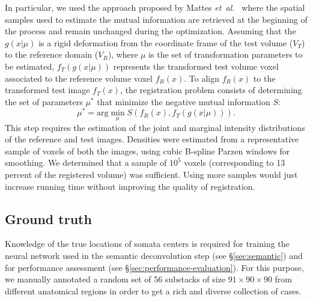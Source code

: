 \documentclass[smallextended]{svjour3}       %
\newcommand{\etal}{\mbox{\emph{et al.\ }}}
\begin{document}
In particular, we used the approach proposed by Mattes \etal
\cite{mattes_nonrigid_2001} where the spatial samples used to
estimate the mutual information are retrieved at the beginning of the
process and remain unchanged during the optimization.
Assuming that the $g(x|\mu)$
is a rigid deformation from the coordinate frame of the test volume
($V_T$) to the reference domain ($V_R$), where $\mu$ is the set of
transformation parameters to be estimated, $f_T (g(x|\mu))$ represents
the transformed test volume voxel associated to the reference volume
voxel $f_R(x)$. To align $f_R(x)$ to the transformed test image
$f_T(x)$, the registration problem consists of determining the set of
parameters $\mu^{*}$ that minimize the negative mutual information $S$:
\begin{equation}
\mu^*=\mathrm{arg}\min_{\mu}S(f_R(x),f_T(g(x|\mu))).
\end{equation}
This step requires the estimation of the joint and
marginal intensity distributions of the reference and test images. Densities were estimated
from a representative sample of voxels of
both the images, using cubic B-spline Parzen
windows for smoothing. %
We determined that a sample of $10^5$ voxels (corresponding to 13 percent of the registered
volume) was sufficient. Using more samples would just increase running time without improving the
quality of registration.


\subsection{Ground truth}
\label{sec:ground-truth}
Knowledge of the true locations of somata centers is required for training the neural network
used in the semantic deconvolution step (see \S\ref{sec:semantic}) and for performance assessment (see
\S\ref{sec:performance-evaluation}).  For this purpose, we manually annotated a
random set of 56 substacks of size $91\times 90\times 90$ from
different anatomical regions in order to get a rich and diverse
collection of cases.
\end{document}
